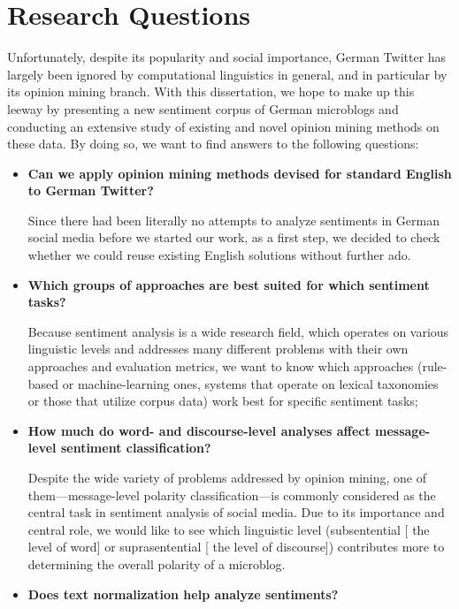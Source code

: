 \section*{Research Questions}

Unfortunately, despite its popularity and social importance, German
Twitter has largely been ignored by computational linguistics in
general, and in particular by its opinion mining branch.  With this
dissertation, we hope to make up this leeway by presenting a new
sentiment corpus of German microblogs and conducting an extensive
study of existing and novel opinion mining methods on these data.  By
doing so, we want to find answers to the following questions:

\begin{itemize}
\item\textbf{Can we apply opinion mining methods devised for
  standard English to German Twitter?}

  Since there had been literally no attempts to analyze sentiments in
  German social media before we started our work, as a first step, we
  decided to check whether we could reuse existing English solutions
  without further ado.

\item\textbf{Which groups of approaches are best suited for which
  sentiment tasks?}

  Because sentiment analysis is a wide research field, which operates
  on various linguistic levels and addresses many different problems
  with their own approaches and evaluation metrics, we want to know
  which approaches (rule-based or machine-learning ones, systems that
  operate on lexical taxonomies or those that utilize corpus data)
  work best for specific sentiment tasks;

\item\textbf{How much do word- and discourse-level analyses affect
  message-level sentiment classification?}

  Despite the wide variety of problems addressed by opinion mining,
  one of them---message-level polarity classification---is commonly
  considered as the central task in sentiment analysis of social
  media.  Due to its importance and central role, we would like to see
  which linguistic level (subsentential [\ie{} the level of word] or
  suprasentential [\ie{} the level of discourse]) contributes more to
  determining the overall polarity of a microblog.

\item\textbf{Does text normalization help analyze sentiments?}


\end{itemize}

